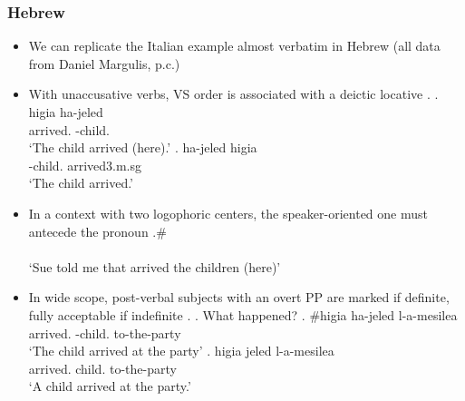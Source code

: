 \documentclass[letterpaper,10pt]{handout_nick}
\begin{document}
\subsubsection{Hebrew}
\begin{itemize}
\item We can replicate the Italian example almost verbatim in Hebrew (all data from Daniel Margulis, p.c.)
\item With unaccusative verbs, VS order is associated with a deictic locative
\ex. \ag. higi\textglotstop a ha-jeled\\
arrived. -child.\\
`The child arrived (here).'
\bg. ha-jeled higi\textglotstop a \\
-child. arrived{3.m.sg}\\
`The child arrived.'

\item In a context with two logophoric centers, the speaker-oriented one must antecede the pronoun
\exg.\# \\
\\
`Sue told me that arrived the children (here)'

\item In wide scope, post-verbal subjects with an overt PP are marked if definite, fully acceptable if indefinite
\ex. \a. What happened?
\bg. \#higi\textglotstop a ha-jeled l-a-mesilea\\
arrived. -child. to-the-party\\
`The child arrived at the party'
\bg. higi\textglotstop a jeled l-a-mesilea\\
arrived. child. to-the-party\\
`A child arrived at the party.'

\end{itemize}
\begin{comment}
\subsubsection{Greek}
\begin{itemize}
\item Expletive triggers \SC{acc} case and agreement at T, as in French, in perfect conformity with the present system
\ex. \ag. echi {[enan tomo]/*[enas tomos]} sto trapezi.\\
has.\SC{3.sg} [one volume]$_\SC{acc/*nom}$ on the table\\
`There is one volume on the table.'
\bg. echi {[dio tomus]/*[dio tomos]} sto trapezi.\\
has.\SC{3.sg} [two volume.\SC{pl}]$_\SC{acc/*nom}$ on the table\\
`There is one volume on the table.'

\item Unaccusatives and passives pattern differently, probably due to the possibility of scrambling

\end{itemize}
\end{comment}
\end{document}
